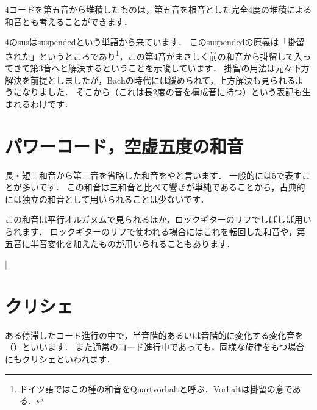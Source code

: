 \documentclass[dvipdfmx,uplatex,b5paper,openany,jbase=12Q,nomag*,textwidth-limit=44%
               ]{gachimuchi}[2020/05/05]
\begin{document}
\Sus4コードを第五音から堆積したものは，第五音を根音とした完全4度の堆積による和音とも考えることができます．
\begin{Yodan}
\Sus4のsusはsuspendedという単語から来ています．
このsuspendedの原義は「掛留された」というところであり\footnote{
  ドイツ語ではこの種の和音をQuartvorhaltと呼ぶ．Vorhaltは掛留の意である．
}，この第4音がまさしく前の和音から掛留して入ってきて第3音へと解決するということを示唆しています．
掛留の用法は元々下方解決を前提としましたが，Bachの時代には緩められて，上方解決も見られるようになりました．
そこから（これは長2度の音を構成音に持つ）という表記も生まれるわけです．
\end{Yodan}

\section{パワーコード，空虚五度の和音}
長・短三和音から第三音を省略した和音をやと言います．
一般的には\txCirc\subsc5で表すことが多いです．
この和音は三和音と比べて響きが単純であることから，古典的には独立の和音として用いられることは少ないです．

この和音は平行オルガヌムで見られるほか，ロックギターのリフでしばしば用いられます．
ロックギターのリフで使われる場合にはこれを転回した和音や，第五音に半音変化を加えたものが用いられることもあります．


\begin{Music}%
  \nostartrule%
  \Startpiece%
  \Notes%
  \en\doublebar%
  \Notes%
  \en\bar
  \Notes%
  \en\NOTes%
  \en\setdoublebar%
  \endpiece
\end{Music}

\section{クリシェ}
ある停滞したコード進行の中で，半音階的あるいは音階的に変化する変化音を
（）といいます．
また通常のコード進行中であっても，同様な旋律をもつ場合にもクリシェといわれます．
\end{document}
